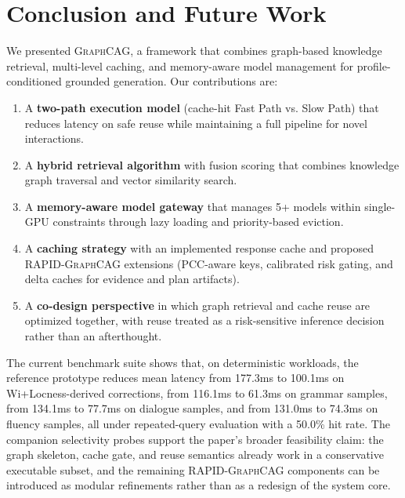 \documentclass[11pt,a4paper,twocolumn]{article}
\newcommand{\graphcag}{\textsc{GraphCAG}}
\newcommand{\rapid}{\textsc{RAPID-GraphCAG}}
\begin{document}
\section{Conclusion and Future Work}
\label{sec:conclusion}

We presented \graphcag{}, a framework that combines graph-based knowledge retrieval, multi-level caching, and memory-aware model management for profile-conditioned grounded generation. Our contributions are:

\begin{enumerate}[leftmargin=*]
  \item A \textbf{two-path execution model} (cache-hit Fast Path vs. Slow Path) that reduces latency on safe reuse while maintaining a full pipeline for novel interactions.
  \item A \textbf{hybrid retrieval algorithm} with fusion scoring that combines knowledge graph traversal and vector similarity search.
  \item A \textbf{memory-aware model gateway} that manages 5+ models within single-GPU constraints through lazy loading and priority-based eviction.
  \item A \textbf{caching strategy} with an implemented response cache and proposed \rapid{} extensions (PCC-aware keys, calibrated risk gating, and delta caches for evidence and plan artifacts).
  \item A \textbf{co-design perspective} in which graph retrieval and cache reuse are optimized together, with reuse treated as a risk-sensitive inference decision rather than an afterthought.
\end{enumerate}

The current benchmark suite shows that, on deterministic workloads, the reference prototype reduces mean latency from 177.3ms to 100.1ms on Wi+Locness-derived corrections, from 116.1ms to 61.3ms on grammar samples, from 134.1ms to 77.7ms on dialogue samples, and from 131.0ms to 74.3ms on fluency samples, all under repeated-query evaluation with a 50.0\% hit rate. The companion selectivity probes support the paper's broader feasibility claim: the graph skeleton, cache gate, and reuse semantics already work in a conservative executable subset, and the remaining \rapid{} components can be introduced as modular refinements rather than as a redesign of the system core.
\end{document}
